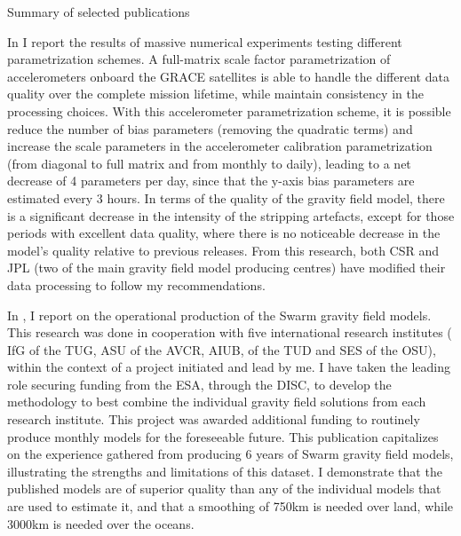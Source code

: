
\begin{cvtext}{Summary of selected publications}


In \cite{TeixeiradaEncarnacao2020} I report the results of massive numerical experiments testing different parametrization schemes.
A full-matrix scale factor parametrization of accelerometers onboard the \ac{GRACE} satellites  is able to handle the different data quality over the complete mission lifetime, while maintain consistency in the processing choices.
With this accelerometer parametrization scheme, it is possible reduce the number of bias parameters (removing the quadratic terms) and increase the scale parameters in the accelerometer calibration parametrization (from diagonal to full matrix and from monthly to daily), leading to a net decrease of 4 parameters per day, since that the y-axis bias parameters are estimated every 3 hours.
In terms of the quality of the gravity field model, there is a significant decrease in the intensity of the stripping artefacts, except for those periods with excellent data quality, where there is no noticeable decrease in the model’s quality relative to previous releases.
From this research, both \ac{CSR} and \ac{JPL} (two of the main gravity field model producing centres) have modified their data processing to follow my recommendations.

In \cite{TeixeiraEncarnacao2019}, I report on the operational production of the Swarm gravity field models.
This research was done in cooperation with five international research institutes (
\acf{IfG} of the \acf{TUG},
\ac{ASU}  of the \acf{AVCR},
\acf{AIUB},
 of the \ac{TUD} and
\acf{SES} of the \acf{OSU}),
within the context of a project initiated and lead by me.
I have taken the leading role securing funding from the \ac{ESA}, through the \ac{DISC}, to develop the methodology to best combine the individual gravity field solutions from each research institute. This project was awarded additional funding to routinely produce monthly models for the foreseeable future.
This publication capitalizes on the experience gathered from producing 6 years of Swarm gravity field models, illustrating the strengths and limitations of this dataset.
I demonstrate that the published models are of superior quality than any of the individual models that are used to estimate it, and that a smoothing of 750km is needed over land, while 3000km is needed over the oceans.


\end{cvtext}
